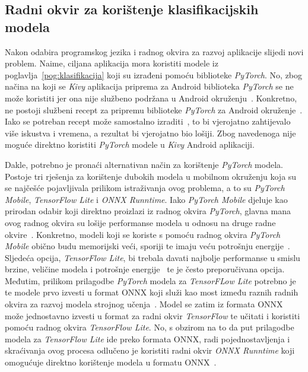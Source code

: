 \documentclass[diplomskirad]{fer}
\begin{document}
		\subsection{Radni okvir za korištenje klasifikacijskih modela}
			Nakon odabira programskog jezika i radnog okvira za razvoj aplikacije slijedi novi problem. Naime, ciljana aplikacija mora koristiti modele iz poglavlja~\ref{pog:klasifikacija} koji su izrađeni pomoću biblioteke \textit{PyTorch}. No, zbog načina na koji se \textit{Kivy} aplikacija priprema za Android biblioteka \textit{PyTorch} se ne može koristiti jer ona nije službeno podržana u Android okruženju~\cite{RedditPyTorchForKivyAndroid}. Konkretno, ne postoji službeni recept za pripremu biblioteke \textit{PyTorch} za Android okruženje~\cite{RedditPyTorchForKivyAndroid}. Iako se potreban recept može samostalno izraditi~\cite{GitHubPyTorchForKivyAndroid}, to bi vjerojatno zahtijevalo više iskustva i vremena, a rezultat bi vjerojatno bio lošiji. Zbog navedenoga nije moguće direktno koristiti \textit{PyTorch} modele u \textit{Kivy} Android aplikaciji.
			
			Dakle, potrebno je pronaći alternativan način za korištenje \textit{PyTorch} modela. Postoje tri rješenja za korištenje dubokih modela u mobilnom okruženju koja su se najčešće pojavljivala prilikom istraživanja ovog problema, a to su \textit{PyTorch Mobile}, \textit{TensorFlow Lite} i \textit{ONNX Runntime}. Iako \textit{PyTorch Mobile} djeluje kao prirodan odabir koji direktno proizlazi iz radnog okvira \textit{PyTorch}, glavna mana ovog radnog okvira su lošije performanse modela u odnosu na druge radne okvire~\cite{DzoneTFLitevsONNXvsPyTochMobile}. Konkretno, modeli koji se koriste s pomoću radnog okvira \textit{PyTorch Mobile} obično budu memorijski veći, sporiji te imaju veću potrošnju energije~\cite{DzoneTFLitevsONNXvsPyTochMobile}. Sljedeća opcija, \textit{TensorFlow Lite}, bi trebala davati najbolje performanse u smislu brzine, veličine modela i potrošnje energije~\cite{DzoneTFLitevsONNXvsPyTochMobile} te je često preporučivana opcija. Međutim, prilikom prilagodbe \textit{PyTorch} modela za \textit{TensorFLow Lite} potrebno je te modele prvo izvesti u format ONNX koji služi kao most između raznih radnih okvira za razvoj modela strojnog učenja~\cite{OnnxExplained}. Model se zatim iz formata ONNX može jednostavno izvesti u format za radni okvir \textit{TensorFlow} te učitati i koristiti pomoću radnog okvira \textit{TensorFlow Lite}. No, s obzirom na to da put prilagodbe modela za \textit{TensorFlow Lite} ide preko formata ONNX, radi pojednostavljenja i skraćivanja ovog procesa odlučeno je koristiti radni okvir \textit{ONNX Runntime} koji omogućuje direktno korištenje modela u formatu ONNX~\cite{OnnxExplained}.
		
\end{document}

